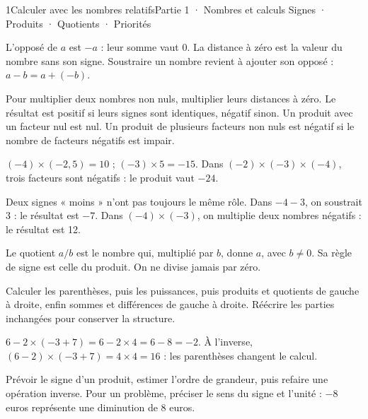 \begin{ouverture}[calcul]{1}{Calculer avec les nombres relatifs}{Partie 1 · Nombres et calculs}
{Signes · Produits · Quotients · Priorités}
\end{ouverture}
\pagestyle{otMain}\essentiel\fontsize{11}{15}\selectfont
{}\label{cours-1-1}
\begin{definition}L’opposé de $a$ est $-a$ : leur somme vaut 0. La distance à zéro est la valeur du nombre sans son signe. Soustraire un nombre revient à ajouter son opposé : $a-b=a+(-b)$.\end{definition}
\begin{propriete}Pour multiplier deux nombres non nuls, multiplier leurs distances à zéro. Le résultat est positif si leurs signes sont identiques, négatif sinon. Un produit avec un facteur nul est nul. Un produit de plusieurs facteurs non nuls est négatif si le nombre de facteurs négatifs est impair.\end{propriete}
\begin{exemple}$(-4)\times(-2{,}5)=10$ ; $(-3)\times5=-15$. Dans $(-2)\times(-3)\times(-4)$, trois facteurs sont négatifs : le produit vaut $-24$.\end{exemple}
\begin{attention}Deux signes « moins » n’ont pas toujours le même rôle. Dans $-4-3$, on soustrait 3 : le résultat est $-7$. Dans $(-4)\times(-3)$, on multiplie deux nombres négatifs : le résultat est 12.\end{attention}
\clearpage
{}\label{cours-1-2}
\begin{propriete}Le quotient $a/b$ est le nombre qui, multiplié par $b$, donne $a$, avec $b\ne0$. Sa règle de signe est celle du produit. On ne divise jamais par zéro.\end{propriete}
\begin{savoirfaire}Calculer les parenthèses, puis les puissances, puis produits et quotients de gauche à droite, enfin sommes et différences de gauche à droite. Réécrire les parties inchangées pour conserver la structure.\end{savoirfaire}
\begin{exemple}$6-2\times(-3+7)=6-2\times4=6-8=-2$. À l’inverse, $(6-2)\times(-3+7)=4\times4=16$ : les parenthèses changent le calcul.\end{exemple}
\begin{savoirfaire}[Contrôler]Prévoir le signe d’un produit, estimer l’ordre de grandeur, puis refaire une opération inverse. Pour un problème, préciser le sens du signe et l’unité : $-8$ euros représente une diminution de 8 euros.\end{savoirfaire}

